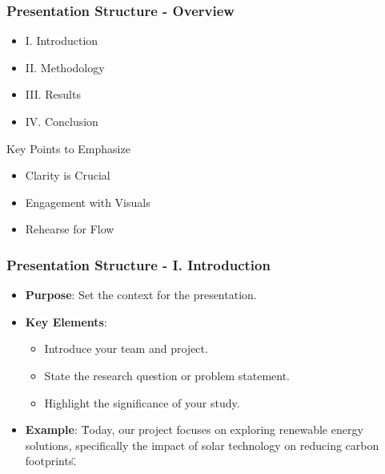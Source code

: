 \documentclass[aspectratio=169]{beamer}
\begin{document}
\begin{frame}[fragile]
    \frametitle{Presentation Structure - Overview}
    \begin{itemize}
        \item I. Introduction
        \item II. Methodology
        \item III. Results
        \item IV. Conclusion
    \end{itemize}
    \begin{block}{Key Points to Emphasize}
        \begin{itemize}
            \item Clarity is Crucial
            \item Engagement with Visuals
            \item Rehearse for Flow
        \end{itemize}
    \end{block}
\end{frame}

\begin{frame}[fragile]
    \frametitle{Presentation Structure - I. Introduction}
    \begin{itemize}
        \item \textbf{Purpose}: Set the context for the presentation.
        \item \textbf{Key Elements}:
            \begin{itemize}
                \item Introduce your team and project.
                \item State the research question or problem statement.
                \item Highlight the significance of your study.
            \end{itemize}
        \item \textbf{Example}: 
            \"Today, our project focuses on exploring renewable energy solutions, specifically the impact of solar technology on reducing carbon footprints.\"
    \end{itemize}
\end{frame}
\end{document}
